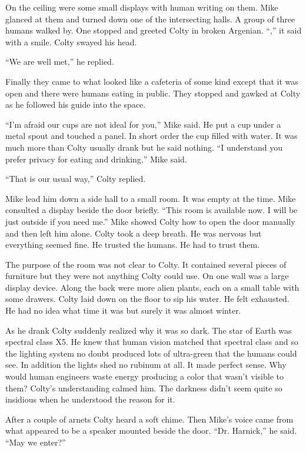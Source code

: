 On the ceiling were some small displays with human writing on them. Mike glanced at them and
turned down one of the intersecting halls. A group of three humans walked by. One stopped and
greeted Colty in broken Argenian. ``,'' it said with a smile. Colty swayed his
head.

``We are well met,'' he replied.

Finally they came to what looked like a cafeteria of some kind except that it was open and there
were humans eating in public. They stopped and gawked at Colty as he followed his guide into
the space.

``I'm afraid our cups are not ideal for you,'' Mike said. He put a cup under a metal spout and
touched a panel. In short order the cup filled with water. It was much more than Colty usually
drank but he said nothing. ``I understand you prefer privacy for eating and drinking,'' Mike
said.

``That is our usual way,'' Colty replied.

Mike lead him down a side hall to a small room. It was empty at the time. Mike consulted a
display beside the door briefly. ``This room is available now. I will be just outside if you
need me.'' Mike showed Colty how to open the door manually and then left him alone. Colty took a
deep breath. He was nervous but everything seemed fine. He trusted the humans. He had to trust
them.

The purpose of the room was not clear to Colty. It contained several pieces of furniture but
they were not anything Colty could use. On one wall was a large display device. Along the back
were more alien plants, each on a small table with some drawers. Colty laid down on the floor to
sip his water. He felt exhausted. He had no idea what time it was but surely it was almost
winter.

As he drank Colty suddenly realized why it was so dark. The star of Earth was spectral class X5.
He knew that human vision matched that spectral class and so the lighting system no doubt
produced lots of ultra-green that the humans could see. In addition the lights shed no rubinum
at all. It made perfect sense. Why would human engineers waste energy producing a color that
wasn't visible to them? Colty's understanding calmed him. The darkness didn't seem quite so
insidious when he understood the reason for it.

After a couple of arnets Colty heard a soft chime. Then Mike's voice came from what appeared to
be a speaker mounted beside the door. ``Dr. Harnick,'' he said. ``May we enter?''

